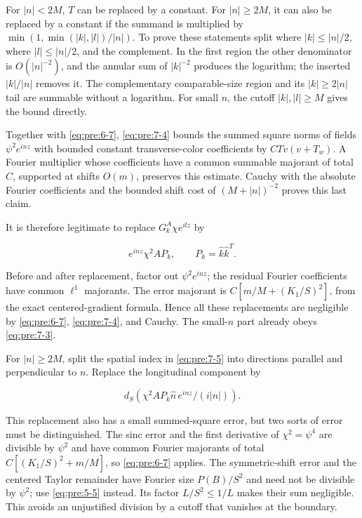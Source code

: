 For \(|n|<2M\), \(T\) can be replaced by a constant. For \(|n|\geq2M\), it can also be replaced by a constant if the summand is multiplied by
\(\min(1,\min(|k|,|l|)/|n|)\). To prove these statements split where \(|k|\leq|n|/2\), where \(|l|\leq|n|/2\), and the complement. In the first region the other denominator is \(O(|n|^{-2})\), and the annular sum of \(|k|^{-2}\) produces the logarithm; the inserted \(|k|/|n|\) removes it. The complementary comparable-size region and its \(|k|\geq2|n|\) tail are summable without a logarithm. For small \(n\), the cutoff \(|k|,|l|\geq M\) gives the bound directly.

Together with \eqref{eq:pre:6-7}, \eqref{eq:pre:7-4} bounds the summed square norms of fields \(\psi^2e^{inz}\) with bounded constant transverse-color coefficients by \(CTv(v+T_w)\). A Fourier multiplier whose coefficients have a common summable majorant of total \(C\), supported at shifts \(O(m)\), preserves this estimate. Cauchy with the absolute Fourier coefficients and the bounded shift cost of \((M+|n|)^{-2}\) proves this last claim.

It is therefore legitimate to replace \(G_k^A\chi e^{ilz}\) by

\begin{equation}
e^{inz}\chi^2A P_k,\qquad P_k=\widehat k\widehat k^T.
\label{eq:pre:7-5}
\end{equation}

Before and after replacement, factor out \(\psi^2e^{inz}\); the residual Fourier coefficients have common \(\ell^1\) majorants. The error majorant is \(C[m/M+(K_1/S)^2]\), from the exact centered-gradient formula. Hence all these replacements are negligible by \eqref{eq:pre:6-7}, \eqref{eq:pre:7-4}, and Cauchy. The small-\(n\) part already obeys \eqref{eq:pre:7-3}.

For \(|n|\geq2M\), split the spatial index in \eqref{eq:pre:7-5} into directions parallel and perpendicular to \(n\). Replace the longitudinal component by

\begin{equation}
d_S\left(\chi^2 A P_k\widehat n\,e^{inz}/(i|n|)\right).
\label{eq:pre:7-6}
\end{equation}

This replacement also has a small summed-square error, but two sorts of error must be distinguished. The sinc error and the first derivative of \(\chi^2=\psi^4\) are divisible by \(\psi^2\) and have common Fourier majorants of total \(C[(K_1/S)^2+m/M]\), so \eqref{eq:pre:6-7} applies. The symmetric-shift error and the centered Taylor remainder have Fourier size \(P(B)/S^2\) and need not be divisible by \(\psi^2\); use \eqref{eq:pre:5-5} instead. Its factor \(L/S^2\leq1/L\) makes their sum negligible. This avoids an unjustified division by a cutoff that vanishes at the boundary.


